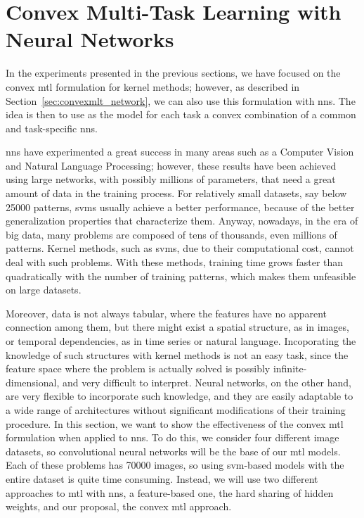 \section{Convex Multi-Task Learning with Neural Networks}\label{sec:convexmtl_nn_experiments}
%
In the experiments presented in the previous sections, we have focused on the convex \acrshort{mtl} formulation for kernel methods; however, as described in Section~\ref{sec:convexmlt_network}, we can also use this formulation with \acrshort{nns}. The idea is then to use as the model for each task a convex combination of a common and task-specific \acrshort{nns}.

%
\acrshort{nns} have experimented a great success in many areas such as a Computer Vision and Natural Language Processing; however, these results have been achieved using large networks, with possibly millions of parameters, that need a great amount of data in the training process. For relatively small datasets, say below \num{25000} patterns, \acrshort{svms} usually achieve a better performance, because of the better generalization properties that characterize them.
%
Anyway, nowadays, in the era of big data, many problems are composed of tens of thousands, even millions of patterns. Kernel methods, such as \acrshort{svms}, due to their computational cost, cannot deal with such problems. With these methods, training time grows faster than quadratically with the number of training patterns, which makes them unfeasible on large datasets.
%

Moreover, data is not always tabular, where the features have no apparent connection among them, but there might exist a spatial structure, as in images, or temporal dependencies, as in time series or natural language. Incoporating the knowledge of such structures with kernel methods is not an easy task, since the feature space where the problem is actually solved is possibly infinite-dimensional, and very difficult to interpret. Neural networks, on the other hand, are very flexible to incorporate such knowledge, and they are easily adaptable to a wide range of architectures without significant modifications of their training procedure.
%
In this section, we want to show the effectiveness of the convex \acrshort{mtl} formulation when applied to \acrshort{nns}. To do this, we consider four different image datasets, so convolutional neural networks will be the base of our \acrshort{mtl} models. Each of these problems has \num{70000} images, so using \acrshort{svm}-based models with the entire dataset is quite time consuming. Instead, we will use two different approaches to \acrshort{mtl} with \acrshort{nns}, a feature-based one, the hard sharing of hidden weights, and our proposal, the convex \acrshort{mtl} approach.


